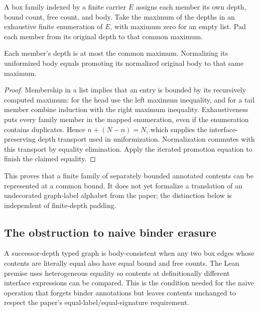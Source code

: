 \begin{definition}
A box family indexed by a finite carrier $E$ assigns each member its own depth,
bound count, free count, and body. Take the maximum of the depths in an
exhaustive finite enumeration of $E$, with maximum zero for an empty list.
Pad each member from its original depth to that common maximum.
\end{definition}


\begin{lemma}
Each member's depth is at most the common maximum. Normalizing its uniformized
body equals promoting its normalized original body to that same maximum.
\end{lemma}
\begin{proof}
Membership in a list implies that an entry is bounded by its recursively
computed maximum: for the head use the left maximum inequality, and for a tail
member combine induction with the right maximum inequality. Exhaustiveness
puts every family member in the mapped enumeration, even if the enumeration
contains duplicates. Hence $n+(N-n)=N$, which supplies the interface-preserving
depth transport used in uniformization. Normalization commutes with this
transport by equality elimination. Apply the iterated promotion equation to
finish the claimed equality.
\end{proof}
This proves that a finite family of separately bounded annotated contents can
be represented at a common bound. It does not yet formalize a translation of
an undecorated graph-label alphabet from the paper; the distinction below is
independent of finite-depth padding.

\subsection{The obstruction to naive binder erasure}
\begin{definition}
A successor-depth typed graph is body-consistent when any two box edges whose
contents are literally equal also have equal bound and free counts. The Lean
premise uses heterogeneous equality so contents at definitionally different
interface expressions can be compared. This is the condition needed for the
naive operation that forgets binder annotations but leaves contents unchanged
to respect the paper's equal-label/equal-signature requirement.
\end{definition}

